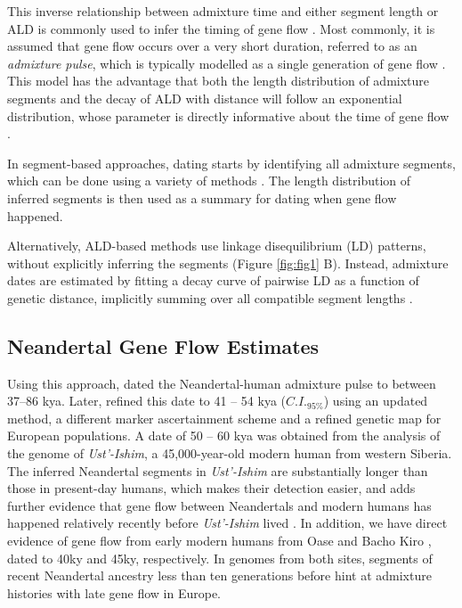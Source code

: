 \documentclass[11pt]{article}
\begin{document}
This inverse relationship between admixture time and either segment length or ALD is commonly used to infer the timing of gene flow \citep{pool_inference_2009,moorjani_history_2011,pugach_dating_2011,gravel_population_2012,sankararaman_date_2012,loh_inferring_2013,hellenthal_genetic_2014,liang_lengths_2014,sankararaman_combined_2016,pugach_gateway_2018,jacobs_multiple_2019}. Most commonly, it is assumed that gene flow occurs over a very short duration, referred to as an \textit{admixture pulse}, which is typically modelled as a single generation of gene flow \citep[e.g][]{moorjani_history_2011}. This model has the advantage that both the length distribution of admixture segments and the decay of ALD with distance will follow an exponential distribution, whose parameter is directly informative about the time of gene flow \citep{pool_inference_2009, gravel_population_2012, liang_lengths_2014}.

In segment-based approaches, dating starts by identifying all admixture segments, which can be done using a variety of methods \citep{seguin_orlando_paleogenomics_2014,sankararaman_combined_2016,vernot_excavating_2016,racimo_signatures_2017,skov_detecting_2018}. The length distribution of inferred segments is then used as a summary for dating when gene flow happened.

Alternatively, ALD-based methods use linkage disequilibrium (LD) patterns, without explicitly inferring the segments \citep{chimusa_dating_2018} (Figure \ref{fig:fig1} B). Instead, admixture dates are estimated by fitting a decay curve of pairwise LD as a function of genetic distance, implicitly summing over all compatible segment lengths \citep{moorjani_history_2011,loh_inferring_2013}. 


\subsection{Neandertal Gene Flow Estimates}
Using this approach,   \cite{sankararaman_date_2012} dated the Neandertal-human admixture pulse to  between 37--86 kya. Later, \cite{moorjani_genetic_2016} refined this date to 41 -- 54 kya ($C.I._{95\%}$) using an updated method, a different marker ascertainment scheme and a refined genetic map for European populations. A date of 50 -- 60 kya was obtained from the analysis of the genome of \textit{Ust'-Ishim}, a 45,000-year-old modern human from western Siberia. The inferred Neandertal segments in \textit{Ust'-Ishim} are substantially longer than those in present-day humans, which makes their detection easier, and adds further evidence that gene flow between Neandertals and modern humans has happened relatively recently before \textit{Ust'-Ishim} lived \citep{fu_genome_2014}. In addition, we have direct evidence of gene flow from early modern humans from Oase \citep{fu_early_2015} and Bacho Kiro \citep{hajdinjak_initial_2021}, dated to 40ky and 45ky, respectively. In genomes from both sites, segments of recent Neandertal ancestry less than ten generations before hint at admixture histories with late gene flow in Europe.
\end{document}
